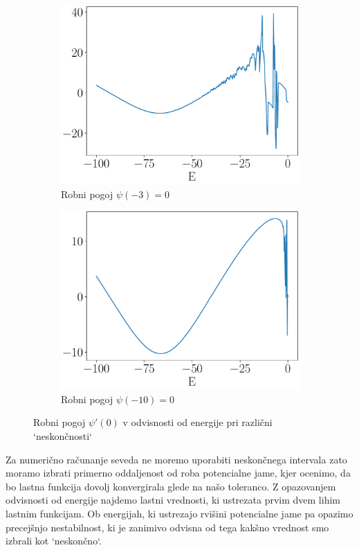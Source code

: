 \documentclass{article}
\begin{document}
\begin{figure}[H]
    \centering
    \begin{subfigure}[b]{0.49\textwidth}
        \centering
        \includegraphics[width=\textwidth]{3oddaljenost.pdf}
		\caption{Robni pogoj $\psi(-3)=0$}
    \end{subfigure}
    \hfill
    \begin{subfigure}[b]{0.49\textwidth}
        \centering
		\includegraphics[width=\textwidth]{10oddaljenost.pdf}
        \caption{Robni pogoj $\psi(-10)=0$}
    \end{subfigure}
	\caption{Robni pogoj $\psi'(0)$ v odvisnosti od energije pri različni `neskončnosti`}
\end{figure}
Za numerično računanje seveda ne moremo uporabiti neskončnega intervala zato moramo izbrati primerno oddaljenost od roba potencialne jame, kjer ocenimo, da bo lastna funkcija dovolj konvergirala glede na našo toleranco. Z opazovanjem odvisnosti od energije najdemo lastni vrednosti, ki ustrezata prvim dvem lihim lastnim funkcijam. Ob energijah, ki ustrezajo rvišini potencialne jame pa opazimo precejšnjo nestabilnost, ki je zanimivo odvisna od tega kakšno vrednost smo izbrali kot `neskončno`.
\end{document}
